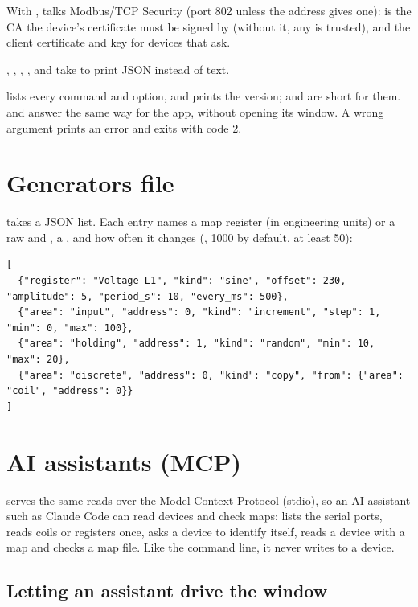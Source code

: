 With ,  talks Modbus/TCP Security (port 802 unless the
address gives one):  is the CA the device's certificate must be
signed by (without it, any is trusted),  and  the
client certificate and key for devices that ask.

, , , ,  and
 take  to print JSON instead of text.

 lists every command and option, and
 prints the version;  and  are
short for them.  and  answer the
same way for the app, without opening its window. A wrong argument prints an
error and exits with code 2.

\section{Generators file}

 takes a JSON list. Each entry names a map register (in
engineering units) or a raw  and , a , and how
often it changes (, 1000 by default, at least 50):

\begin{lstlisting}
[
  {"register": "Voltage L1", "kind": "sine", "offset": 230, "amplitude": 5, "period_s": 10, "every_ms": 500},
  {"area": "input", "address": 0, "kind": "increment", "step": 1, "min": 0, "max": 100},
  {"area": "holding", "address": 1, "kind": "random", "min": 10, "max": 20},
  {"area": "discrete", "address": 0, "kind": "copy", "from": {"area": "coil", "address": 0}}
]
\end{lstlisting}

\section{AI assistants (MCP)}

 serves the same reads over the Model Context Protocol
(stdio), so an AI assistant such as Claude Code can read devices and check
maps:  lists the serial ports,
 reads coils or registers once, 
asks a device to identify itself,  reads a device with a map and
 checks a map file. Like the command line, it never writes to a device.

\subsection{Letting an assistant drive the window}

